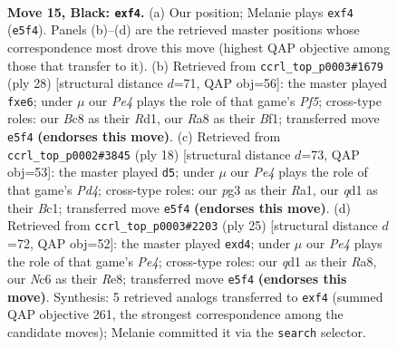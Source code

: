 \documentclass[11pt]{article}
\begin{document}
\clearpage

\begin{figure}[p]\centering
\begin{subfigure}{0.46\textwidth}\centering
\resizebox{\linewidth}{!}{%
\newchessgame
\chessboard[
  setfen={r1b1r1k1/ppp1qpp1/2n2n1p/P3p2P/2P2P2/2P1P1P1/3B4/R2QKBNR b KQ - 0 15},
  showmover=false,
  pgfstyle=straightmove, color=movearrow, markmove={e5-f4}
]}
\caption{}
\end{subfigure}\hfill
\begin{subfigure}{0.46\textwidth}\centering
\resizebox{\linewidth}{!}{%
\newchessgame
\chessboard[
  setfen={r1b1k2r/1pq1bpp1/p2pp3/4nP1p/4P2P/1NN5/PPPQ2P1/1K1R1B1R w kq - 1 15},
  showmover=false,
  pgfstyle=straightmove, color=movearrow, markmove={f5-e6}
]}
\caption{}
\end{subfigure}
\\[4pt]
\begin{subfigure}{0.46\textwidth}\centering
\resizebox{\linewidth}{!}{%
\newchessgame
\chessboard[
  setfen={rn1qk2r/pb2bppp/1p1pp3/2p5/2PP4/2P2NP1/P3PPBP/R1BQR1K1 w kq - 0 10},
  showmover=false,
  pgfstyle=straightmove, color=movearrow, markmove={d4-d5}
]}
\caption{}
\end{subfigure}\hfill
\begin{subfigure}{0.46\textwidth}\centering
\resizebox{\linewidth}{!}{%
\newchessgame
\chessboard[
  setfen={r1bqr1k1/pp3pp1/2np1n1p/4p3/2PP4/3BP1NP/P4PP1/R1BQ1RK1 b - - 0 13},
  showmover=false,
  pgfstyle=straightmove, color=movearrow, markmove={e5-d4}
]}
\caption{}
\end{subfigure}
\caption{\textbf{Move 15, Black: \texttt{exf4}.} (a) Our position; Melanie plays \texttt{exf4} (\texttt{e5f4}). Panels (b)--(d) are the retrieved master positions whose correspondence most drove this move (highest QAP objective among those that transfer to it). (b) Retrieved from \texttt{ccrl\_top\_p0003\#1679} (ply 28) [structural distance $d$=71, QAP obj=56]: the master played \texttt{fxe6}; under $\mu$ our \emph{Pe4} plays the role of that game's \emph{Pf5}; cross-type roles: our \emph{B}c8 as their \emph{R}d1, our \emph{R}a8 as their \emph{B}f1; transferred move \texttt{e5f4} \textbf{(endorses this move)}. (c) Retrieved from \texttt{ccrl\_top\_p0002\#3845} (ply 18) [structural distance $d$=73, QAP obj=53]: the master played \texttt{d5}; under $\mu$ our \emph{Pe4} plays the role of that game's \emph{Pd4}; cross-type roles: our \emph{p}g3 as their \emph{R}a1, our \emph{q}d1 as their \emph{B}c1; transferred move \texttt{e5f4} \textbf{(endorses this move)}. (d) Retrieved from \texttt{ccrl\_top\_p0003\#2203} (ply 25) [structural distance $d$=72, QAP obj=52]: the master played \texttt{exd4}; under $\mu$ our \emph{Pe4} plays the role of that game's \emph{Pe4}; cross-type roles: our \emph{q}d1 as their \emph{R}a8, our \emph{N}c6 as their \emph{R}e8; transferred move \texttt{e5f4} \textbf{(endorses this move)}. Synthesis: 5 retrieved analogs transferred to \texttt{exf4} (summed QAP objective 261, the strongest correspondence among the candidate moves); Melanie committed it via the \texttt{search} selector.}
\label{fig:thought-m29}
\end{figure}
\end{document}
